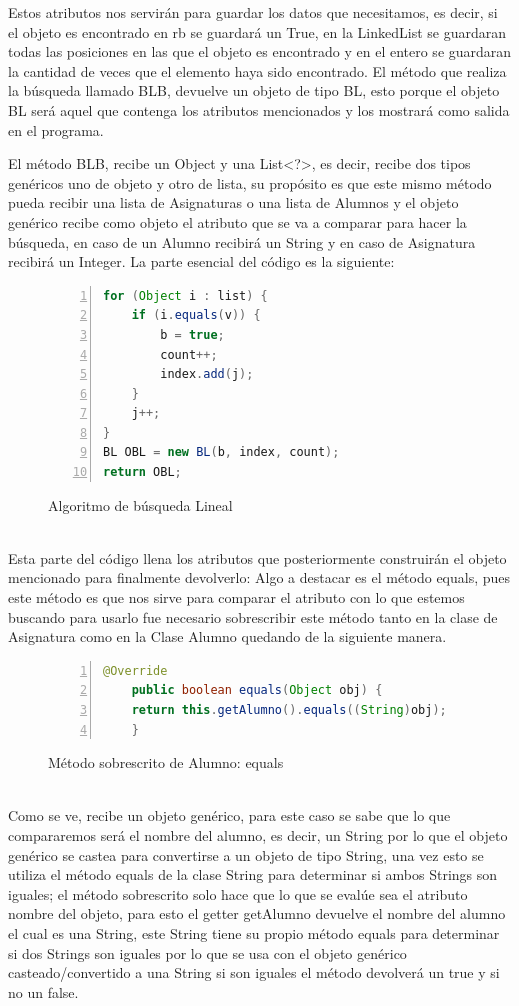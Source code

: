 \documentclass{report}
\begin{document}
Estos atributos nos servirán para guardar los datos que necesitamos, es decir, si el objeto es encontrado en rb se guardará un True, en la LinkedList se guardaran todas las posiciones en las que el objeto es encontrado y en el entero se guardaran la cantidad de veces que el elemento haya sido encontrado.
\newpage
El método que realiza la búsqueda llamado BLB, devuelve un objeto de tipo BL, esto porque el objeto BL será aquel que contenga los atributos mencionados y los mostrará como salida en el programa.

El método BLB, recibe un Object y una List<?>, es decir, recibe dos tipos genéricos uno de objeto y otro de lista, su propósito es que este mismo método pueda recibir una lista de Asignaturas o una lista de Alumnos y el objeto genérico recibe como objeto el atributo que se va a comparar para hacer la búsqueda, en caso de un Alumno recibirá un String y en caso de Asignatura recibirá un Integer.
La parte esencial del código es la siguiente:             
\begin{figure}[htbp]
\centering
\begin{lstlisting}[language=Java, frame=lines, framesep=2mm, basicstyle=\footnotesize\ttfamily, numbers=left]
for (Object i : list) {
    if (i.equals(v)) {
        b = true;
        count++;
        index.add(j);
    }
    j++;
}
BL OBL = new BL(b, index, count);
return OBL;
\end{lstlisting}
\caption{Algoritmo de búsqueda Lineal}
\end{figure}
\\Esta parte del código llena los atributos que posteriormente construirán el objeto mencionado para finalmente devolverlo:
Algo a destacar es el método equals, pues este método es que nos sirve para comparar el atributo con lo que estemos buscando para usarlo fue necesario sobrescribir este método tanto en la clase de Asignatura como en la Clase Alumno quedando de la siguiente manera.
\begin{figure}[htbp]
\centering
\begin{lstlisting}[language=Java, frame=lines, framesep=2mm, basicstyle=\footnotesize\ttfamily, numbers=left]
    @Override
    public boolean equals(Object obj) {
    return this.getAlumno().equals((String)obj);
    }
\end{lstlisting}
\caption{Método sobrescrito de Alumno: equals}
\end{figure}
\\Como se ve, recibe un objeto genérico, para este caso se sabe que lo que compararemos será el nombre del alumno, es decir, un String por lo que el objeto genérico se castea para convertirse a un objeto de tipo String, una vez esto se utiliza el método equals de la clase String para determinar si ambos Strings son iguales; el método sobrescrito solo hace que lo que se evalúe sea el atributo nombre del objeto, para esto el getter getAlumno devuelve el nombre del alumno el cual es una String, este String tiene su propio método equals para determinar si dos Strings son iguales por lo que se usa con el objeto genérico casteado/convertido a una String si son iguales el método devolverá un true y si no un false.
\end{document}
